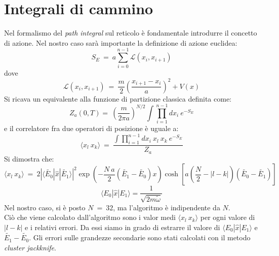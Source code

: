 \section*{Integrali di cammino}
Nel formalismo del \emph{path integral} sul reticolo è fondamentale introdurre il concetto di azione.
Nel nostro caso sarà importante la definizione di azione euclidea:
$$
 S_E  \ = \ a \sum_{i=0}^{n-1} \mathcal{L}(x_i,x_{i+1})
$$
dove
$$
\mathcal{L}(x_i,x_{i+1}) \ = \ \frac{m}{2} \left( \frac{x_{i+1} -x_{i}}{a} \right)^2 + V(x)  
$$
 Si ricava un equivalente alla funzione di partizione classica definita come: 
$$
 Z_a (0,T) =  \ \left( \frac{m}{2 \pi a}\right)^{N/2} \int \prod_{i=1}^{n-1} dx_i \ e^{-S_E}
$$
e il correlatore fra due operatori di posizione è uguale a:
$$
 \langle x_l \ x_k \rangle  \ = \  \frac{ \int \prod_{i=1}^{n-1} dx_i \ x_l \ x_k \ e^{-S_E}}{Z_a}
$$
Si dimostra che:
$$
 \langle x_l \ x_k \rangle \ = \ 2 | \langle \tilde{E_0} | \hat{x} | \tilde{E_1} \rangle  |^2 \exp{\left( - \frac{N\ a}{2} \left( \tilde{E_1}-\tilde{E_0} \right) x \right)} \cosh \left[ a \left( \frac{N}{2} - | l - k | \right) (\tilde{E_0} -\tilde{E_1}) \right]  
$$
$$ 
\langle E_0 | \hat{x} | E_1 \rangle  = \frac{1}{\sqrt{2  m \tilde{\omega}}}
$$
Nel nostro caso, si è posto $ N \ = \ 32 $, ma l'algoritmo è indipendente da $N$.\\
Ciò che viene calcolato dall'algoritmo sono i valor medi $\langle x_l \ x_k \rangle $ per ogni valore di $ | l - k| $ e i relativi errori.
Da essi siamo in grado di estrarre il valore di $ \langle E_0 | \hat{x} | E_1 \rangle $ e $ \tilde{E_1}-\tilde{E_0} $.
Gli errori sulle grandezze secondarie sono stati calcolati con il metodo \emph{cluster jackknife}.
